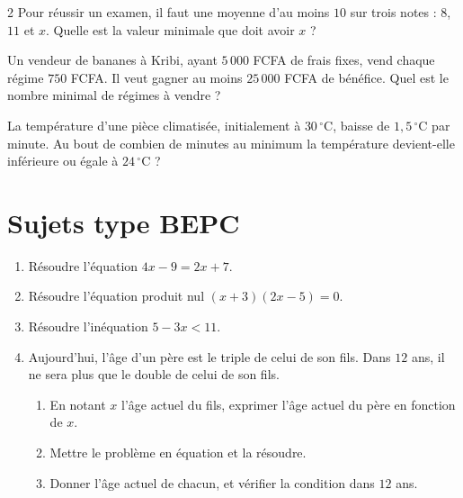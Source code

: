 \begin{multicols}{2}
\exo{} Pour réussir un examen, il faut une moyenne d'au moins $10$ sur trois notes :
$8$, $11$ et $x$. Quelle est la valeur minimale que doit avoir $x$ ?

\exo{} Un vendeur de bananes à Kribi, ayant $5\,000$ FCFA de frais fixes, vend
chaque régime $750$ FCFA. Il veut gagner au moins $25\,000$ FCFA de bénéfice. Quel est le
nombre minimal de régimes à vendre ?

\exo{} La température d'une pièce climatisée, initialement à $30\,^{\circ}\text{C}$,
baisse de $1{,}5\,^{\circ}\text{C}$ par minute. Au bout de combien de minutes au minimum la
température devient-elle inférieure ou égale à $24\,^{\circ}\text{C}$ ?

\end{multicols}

\section{Sujets type BEPC}

\begin{enumerate}[label=\arabic*)]
\item Résoudre l'équation $4x-9=2x+7$.
\item Résoudre l'équation produit nul $(x+3)(2x-5)=0$.
\item Résoudre l'inéquation $5-3x<11$.
\item Aujourd'hui, l'âge d'un père est le triple de celui de son fils. Dans $12$ ans, il ne
sera plus que le double de celui de son fils.
\begin{enumerate}[label=\alph*)]
\item En notant $x$ l'âge actuel du fils, exprimer l'âge actuel du père en fonction de $x$.
\item Mettre le problème en équation et la résoudre.
\item Donner l'âge actuel de chacun, et vérifier la condition dans $12$ ans.
\end{enumerate}
\end{enumerate}

